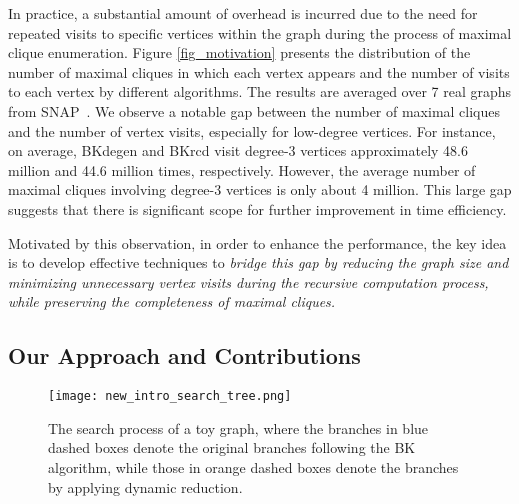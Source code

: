 \documentclass[sigconf, nonacm]{acmart}
\newcommand{\red}[1]{{\color{red}{#1}}}
\begin{document}
In practice, a substantial amount of overhead is incurred due to the need for repeated visits to specific vertices within the graph during the process of maximal clique enumeration. %
Figure \ref{fig_motivation} presents the distribution of the number of maximal cliques in which each vertex appears and the number of visits to each vertex by different algorithms. 
The results are averaged over 7 real graphs from SNAP~\cite{snapnets}.
We observe a notable gap between the number of maximal cliques and the number of vertex visits, especially for low-degree vertices.
For instance, on average, BKdegen and BKrcd visit degree-3 vertices approximately 48.6 million and 44.6 million times, respectively. However, the average number of maximal cliques involving degree-3 vertices is only about 4 million.
This large gap 
suggests that there is significant scope for further improvement in time efficiency.

Motivated by this observation, in order to enhance the performance, the key idea is to develop effective techniques to %
\textit{bridge this gap by reducing the graph size and minimizing unnecessary vertex visits during the recursive computation process, while preserving the completeness of maximal cliques.}

\subsection{Our Approach and Contributions}



\begin{figure}[tbp]
\centerline{\texttt{[image: new\_intro\_search\_tree.png]}}
\vspace{-0.1in}
\caption{%
The search process of a toy graph, %
where the branches in blue dashed boxes denote the original branches following the BK algorithm, while those in orange dashed boxes denote the branches by applying dynamic reduction. 
}
\label{fig_mov_search_tree}
\vspace{-0.2in}
\end{figure}
\end{document}

